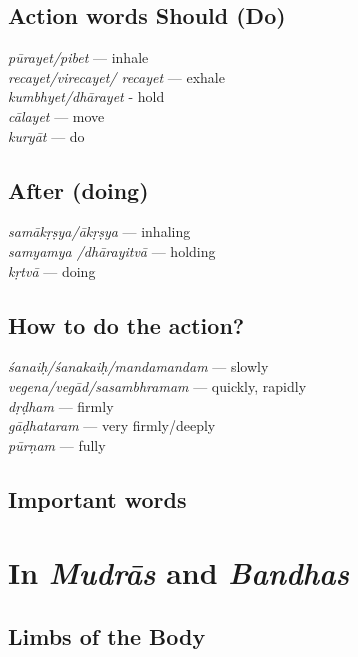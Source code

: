 \subsection*{Action words Should (Do)}

\begin{multicols}{2}
\textit{pūrayet/pibet} --- inhale\\
\textit{recayet/virecayet/ recayet} --- exhale \\
\textit{kumbhyet/dhārayet} - hold\\
\textit{cālayet} --- move\\
\textit{kuryāt} --- do
\end{multicols}

\subsection*{After (doing)}

\begin{multicols}{2}
\textit{samākṛṣya/ākṛṣya} --- inhaling \\
\textit{samyamya /dhārayitvā}  --- holding\\
\textit{kṛtvā} --- doing
\end{multicols}

\subsection*{How to do the action?}

\begin{multicols}{2}
\textit{śanaiḥ/śanakaiḥ/mandamandam} --- slowly\\
\textit{vegena/vegād/sasambhramam} --- quickly, rapidly\\
\textit{dṛḍham} --- firmly\\
\textit{gāḍhataram} --- very firmly/deeply\\
\textit{pūrṇam} --- fully
\end{multicols}

\subsection*{Important words}

\section*{In \textit{Mudrās} and \textit{Bandhas}}

\subsection*{Limbs of the Body}

